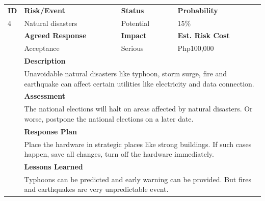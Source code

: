\documentclass[a4paper, 11pt]{article}
\begin{document}
\begin{table}[H]
	\begin{tabular}{l| l l l}
		
		\textbf{ID} & \textbf{Risk/Event} & \textbf{Status} & \textbf{Probability}\\
		4 & Natural disasters & Potential & 15\% \\
		& \textbf{Agreed Response} & \textbf{Impact} & \textbf{Est. Risk Cost} \\
		& Acceptance & Serious & Php100,000 \\
		& \textbf{Description} \\
		& \multicolumn{3}{p{\linewidth}}{Unavoidable natural disasters like typhoon, storm surge, fire and earthquake can affect certain utilities like electricity and data connection.} \\
		& \textbf{Assessment} \\
		& \multicolumn{3}{p{\linewidth}}{The national elections will halt on areas affected by natural disasters. Or worse, postpone the national elections on a later date.} \\
		& \textbf{Response Plan} \\
		& \multicolumn{3}{p{\linewidth}}{Place the hardware in strategic places like strong buildings. If such cases happen, save all changes, turn off the hardware immediately.} \\
		& \textbf{Lessons Learned} \\
		& \multicolumn{3}{p{\linewidth}}{Typhoons can be predicted and early warning can be provided. But fires and earthquakes are very unpredictable event.}\\
		\hline
		

\end{tabular}
\end{table}
\end{document}
